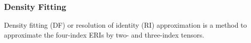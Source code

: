 \documentclass{article}
\begin{document}
                

        
        \subsubsection{Density Fitting}
            Density fitting (DF) or resolution of identity (RI) approximation is a method to approximate the four-index ERIs by two- and three-index tensors.


            
\end{document}
